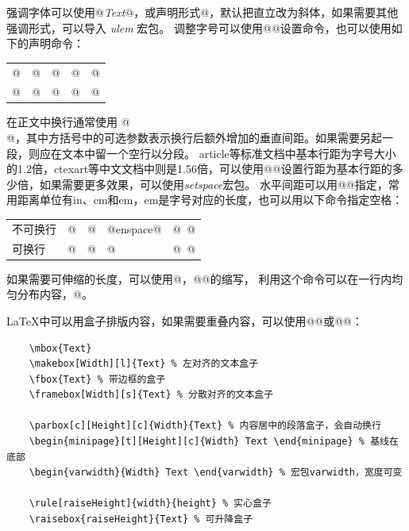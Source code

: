 强调字体可以使用@\emph{Text}@，或声明形式@\em@，默认把直立改为斜体，如果需要其他强调形式，可以导入 \emph{ulem} 宏包。
调整字号可以使用@\zihao{}@设置命令，也可以使用如下的声明命令：
\begin{table}[ht]
	\centering
	\begin{tabular}{|lllll|}
		\hline
		@\tiny@  & @\scripysize@ & @\footnotesize@ & @\small@ & @\normalsize@ \\
		@\large@ & @\Large@      & @\LARGE@        & @\huge@  & @\Huge@       \\
		\hline
	\end{tabular}
\end{table}

在正文中换行通常使用 @\\[2cm]@，其中方括号中的可选参数表示换行后额外增加的垂直间距。如果需要另起一段，则应在文本中留一个空行以分段。
article等标准文档中基本行距为字号大小的1.2倍，ctexart等中文文档中则是1.56倍，可以使用@\linespread{}@设置行距为基本行距的多少倍，如果需要更多效果，可以使用\emph{setspace}宏包。
水平间距可以用@\hspace{}@指定，常用距离单位有in、cm和em，em是字号对应的长度，也可以用以下命令指定空格：
\begin{table}[H]
	\centering
	\begin{tabular}{|lllll|}
		\hline
		不可换行 & @\negthinspace@ & @\thinspace@ & @enspace@ & @~@ \\
		可换行  & @\enskip@       & @\quad@      & @\qquad@  & @\ @                \\
		\hline
	\end{tabular}
\end{table}
如果需要可伸缩的长度，可以使用@\fill@，@\hspace{\fill}@的缩写，
利用这个命令可以在一行内均匀分布内容，@。

\LaTeX 中可以用盒子排版内容，如果需要重叠内容，可以使用@@或@@：
\begin{code}[title=盒子示例]
	\begin{verbatim}
    \mbox{Text}
    \makebox[Width][l]{Text} % 左对齐的文本盒子
    \fbox{Text} % 带边框的盒子
    \framebox[Width][s]{Text} % 分散对齐的文本盒子

    \parbox[c][Height][c]{Width}{Text} % 内容居中的段落盒子，会自动换行
    \begin{minipage}[t][Height][c]{Width} Text \end{minipage} % 基线在底部
    \begin{varwidth}{Width} Text \end{varwidth} % 宏包varwidth，宽度可变

    \rule[raiseHeight]{width}{height} % 实心盒子
    \raisebox{raiseHeight}{Text} % 可升降盒子
\end{verbatim}
\end{code}
